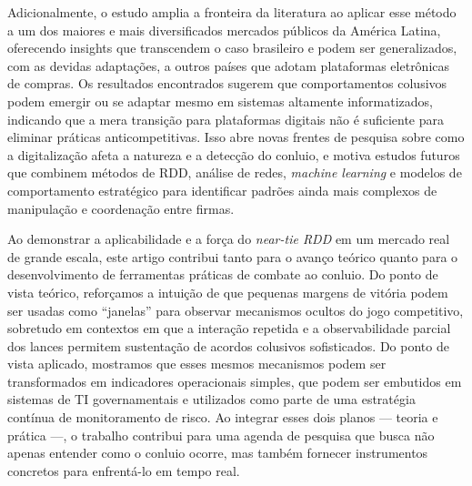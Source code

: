 \documentclass[12pt,a4paper]{article}
\begin{document}
Adicionalmente, o estudo amplia a fronteira da literatura ao aplicar esse método a um dos maiores e mais diversificados mercados públicos da América Latina, oferecendo insights que transcendem o caso brasileiro e podem ser generalizados, com as devidas adaptações, a outros países que adotam plataformas eletrônicas de compras. Os resultados encontrados sugerem que comportamentos colusivos podem emergir ou se adaptar mesmo em sistemas altamente informatizados, indicando que a mera transição para plataformas digitais não é suficiente para eliminar práticas anticompetitivas. Isso abre novas frentes de pesquisa sobre como a digitalização afeta a natureza e a detecção do conluio, e motiva estudos futuros que combinem métodos de RDD, análise de redes, \textit{machine learning} e modelos de comportamento estratégico para identificar padrões ainda mais complexos de manipulação e coordenação entre firmas.

Ao demonstrar a aplicabilidade e a força do \textit{near-tie RDD} em um mercado real de grande escala, este artigo contribui tanto para o avanço teórico quanto para o desenvolvimento de ferramentas práticas de combate ao conluio. Do ponto de vista teórico, reforçamos a intuição de que pequenas margens de vitória podem ser usadas como ``janelas'' para observar mecanismos ocultos do jogo competitivo, sobretudo em contextos em que a interação repetida e a observabilidade parcial dos lances permitem sustentação de acordos colusivos sofisticados. Do ponto de vista aplicado, mostramos que esses mesmos mecanismos podem ser transformados em indicadores operacionais simples, que podem ser embutidos em sistemas de TI governamentais e utilizados como parte de uma estratégia contínua de monitoramento de risco. Ao integrar esses dois planos — teoria e prática —, o trabalho contribui para uma agenda de pesquisa que busca não apenas entender como o conluio ocorre, mas também fornecer instrumentos concretos para enfrentá-lo em tempo real.
\end{document}
